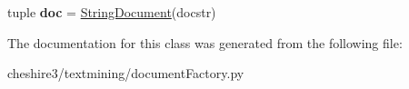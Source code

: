 \begin{DoxyCompactItemize}
\item 
\hypertarget{classcheshire3_1_1textmining_1_1document_factory_1_1_enju_record_document_stream_a0a5f4a482233120f94f6eaa69be2ae6a}{tuple {\bfseries doc} = \hyperlink{classcheshire3_1_1document_1_1_string_document}{String\-Document}(docstr)}\label{classcheshire3_1_1textmining_1_1document_factory_1_1_enju_record_document_stream_a0a5f4a482233120f94f6eaa69be2ae6a}

\end{DoxyCompactItemize}


The documentation for this class was generated from the following file\-:\begin{DoxyCompactItemize}
\item 
cheshire3/textmining/document\-Factory.\-py\end{DoxyCompactItemize}
